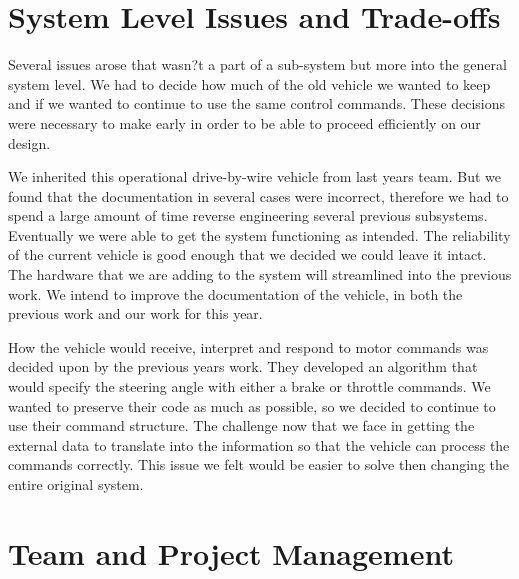 \section{System Level Issues and Trade-offs}
	
Several issues arose that wasn?t a part of a sub-system but more into the general system level.  We had to decide how much of the old vehicle we wanted to keep and if we wanted to continue to use the same control commands.  These decisions were necessary to make early in order to be able to proceed efficiently on our design.

We inherited this operational drive-by-wire vehicle from last years team.  But we found that the documentation in several cases were incorrect, therefore we had to spend a large amount of time reverse engineering several previous subsystems.  Eventually we were able to get the system functioning as intended.  The reliability of the current vehicle is good enough that we decided we could leave it intact.  The hardware that we are adding to the system will streamlined into the previous work.  We intend to improve the documentation of the vehicle, in both the previous work and our work for this year.

How the vehicle would receive, interpret and respond to motor commands was decided upon by the previous years work.  They developed an algorithm that would specify the steering angle with either a brake or throttle commands.  We wanted to preserve their code as much as possible, so we decided to continue to use their command structure.  The challenge now that we face in getting the external data to translate into the information so that the vehicle can process the commands correctly.  This issue we felt would be easier to solve then changing the entire original system.

	\section{Team and Project Management}

